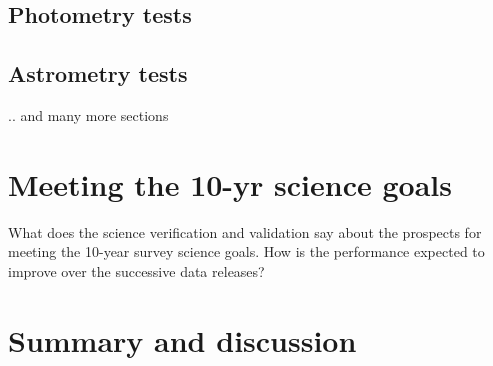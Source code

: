 \subsection{Photometry tests }

\subsection{Astrometry tests }

 .. and many more sections


 \section{Meeting the 10-yr science goals} 
 What does the science verification and validation say about the prospects for meeting the 10-year survey science goals. How is the performance expected to improve over the successive data releases? 
 \section{Summary and discussion} 